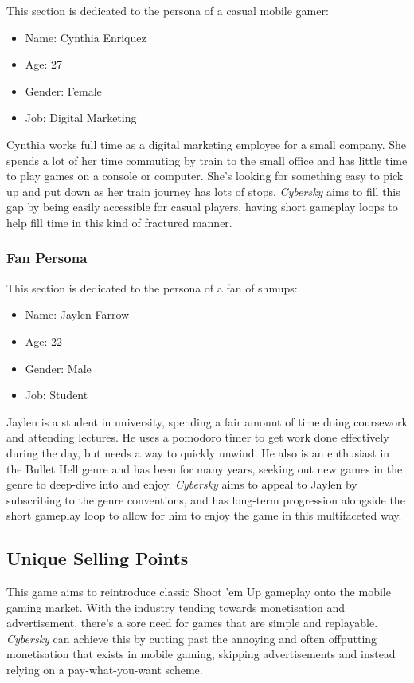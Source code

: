 \documentclass{scrartcl}
\begin{document}
This section is dedicated to the persona of a casual mobile gamer:

\begin{itemize}
  \item Name: Cynthia Enriquez
  \item Age: 27
  \item Gender: Female
  \item Job: Digital Marketing
\end{itemize}

Cynthia works full time as a digital marketing employee for a small company. She spends a lot of her time commuting by train to the small office and has little time to play games on a console or computer. She's looking for something easy to pick up and put down as her train journey has lots of stops. \emph{Cybersky} aims to fill this gap by being easily accessible for casual players, having short gameplay loops to help fill time in this kind of fractured manner.

\subsubsection{Fan Persona}

This section is dedicated to the persona of a fan of shmups:

\begin{itemize}
  \item Name: Jaylen Farrow
  \item Age: 22
  \item Gender: Male
  \item Job: Student
\end{itemize}

Jaylen is a student in university, spending a fair amount of time doing coursework and attending lectures. He uses a pomodoro timer to get work done effectively during the day, but needs a way to quickly unwind. He also is an enthusiast in the Bullet Hell genre and has been for many years, seeking out new games in the genre to deep-dive into and enjoy. \emph{Cybersky} aims to appeal to Jaylen by subscribing to the genre conventions, and has long-term progression alongside the short gameplay loop to allow for him to enjoy the game in this multifaceted way.

\subsection{Unique Selling Points}

This game aims to reintroduce classic Shoot 'em Up gameplay onto the mobile gaming market. With the industry tending towards monetisation and advertisement, there's a sore need for games that are simple and replayable. \emph{Cybersky} can achieve this by cutting past the annoying and often offputting monetisation that exists in mobile gaming, skipping advertisements and instead relying on a pay-what-you-want scheme.
\end{document}
